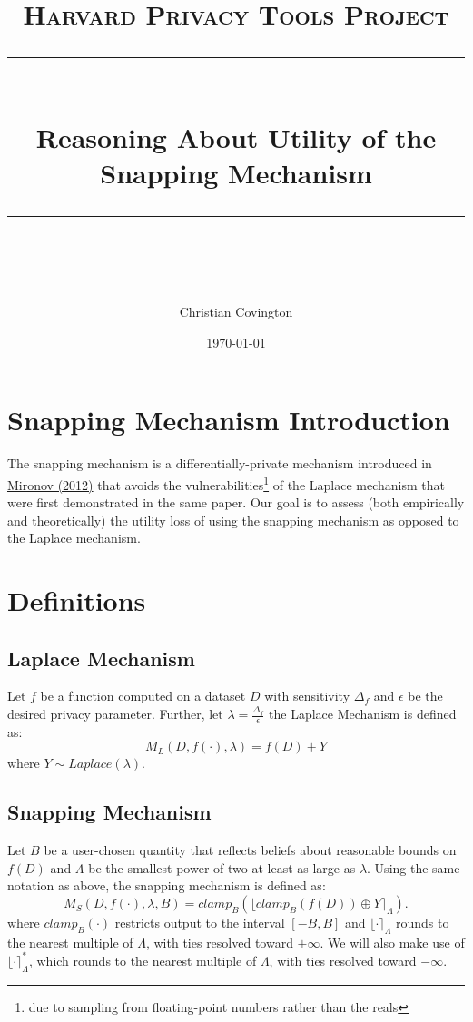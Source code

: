 \documentclass[11pt]{scrartcl} %
\title{
	\normalfont\normalsize
	\textsc{Harvard Privacy Tools Project}\\ %
	\vspace{25pt} %
	\rule{\linewidth}{0.5pt}\\ %
	\vspace{20pt} %
	{\huge Reasoning About Utility of the Snapping Mechanism}\\ %
	\vspace{12pt} %
	\rule{\linewidth}{2pt}\\ %
	\vspace{12pt} %
}
\author{\LARGE Christian Covington} %
\date{\normalsize\today} %
\begin{document}
\maketitle %

\section{Snapping Mechanism Introduction}
The snapping mechanism is a differentially-private mechanism introduced in \href{http://citeseerx.ist.psu.edu/viewdoc/download?doi=10.1.1.366.5957&rep=rep1&type=pdf}{Mironov (2012)} that avoids the vulnerabilities\footnote{due to sampling from floating-point numbers rather than the reals} of the Laplace mechanism that were first demonstrated in the same paper. Our goal is to assess (both empirically and theoretically) the utility loss of using the snapping mechanism as opposed to the Laplace mechanism. \newline

\section{Definitions}
\subsection{Laplace Mechanism}
Let $f$ be a function computed on a dataset $D$ with sensitivity $\Delta_f$ and $\epsilon$ be the desired privacy parameter. Further, let $\lambda = \frac{\Delta_f}{\epsilon}$ the Laplace Mechanism is defined as:
\[ M_{L}(D, f(\cdot), \lambda) = f(D) + Y \]
where $Y \sim Laplace(\lambda)$.

\subsection{Snapping Mechanism}
Let $B$ be a user-chosen quantity that reflects beliefs about reasonable bounds on $f(D)$ and $\Lambda$ be the smallest power of two at least as large as $\lambda$. Using the same notation as above, the snapping mechanism is defined as:
\[ M_{S}(D, f(\cdot), \lambda, B) = clamp_{B}\left( \lfloor clamp_{B}\left( f(D) \right) \oplus Y \rceil_{\Lambda} \right). \]
where $clamp_{B}(\cdot)$ restricts output to the interval $[-B, B]$ and $\lfloor \cdot \rceil_{\Lambda}$ rounds to the nearest multiple of $\Lambda$, with ties resolved toward $+ \infty$. We will also make use of $\lfloor \cdot \rceil^{*}_{\Lambda}$, which rounds to the nearest multiple of $\Lambda$, with ties resolved toward $- \infty$. \newline
\end{document}
